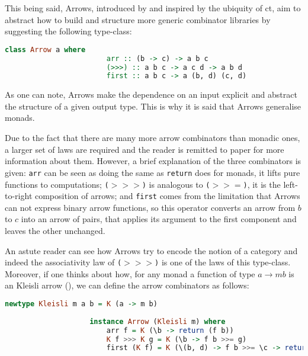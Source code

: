 \documentclass[
  oneside,
  11pt, a4paper,
  footinclude=true,
  headinclude=true,
  cleardoublepage=empty
]{scrbook}
\theoremstyle{definition}
\theoremstyle{definition}
\begin{document}
    	        This being said, Arrows, introduced by \cite{Hughes:2000:GMA:347238.347246} and inspired by the ubiquity of \gls{ct}, aim to abstract how to build and structure more generic combinator libraries by suggesting the following type-class:
    	        
                \begin{lstlisting}[mathescape, language=Haskell, caption={Arrow type-class},captionpos=b]
                    class Arrow a where
                        arr :: (b -> c) -> a b c
                        (>>>) :: a b c -> a c d -> a b d
                        first :: a b c -> a (b, d) (c, d)
    	        \end{lstlisting}{}
    	       
    	       As one can note, Arrows make the dependence on an input explicit and abstract the structure of a given output type. This is why it is said that Arrows generalise monads.
    	       
    	       Due to the fact that there are many more arrow combinators than monadic ones, a larger set of laws are required and the reader is remitted to \cite{Hughes:2000:GMA:347238.347246} paper for more information about them. However, a brief explanation of the three combinators is given: \texttt{arr} can be seen as doing the same as \texttt{return} does for monads, it lifts pure functions to computations; \texttt{($>>>$)} is analogous to \texttt{($>>=$)}, it is the left-to-right composition of arrows; and \texttt{first} comes from the limitation that Arrows can not express binary arrow functions, so this operator converts an arrow from $b$ to $c$ into an arrow of pairs, that applies its argument to the first component and leaves the other unchanged.
    	       
    	       An astute reader can see how Arrows try to encode the notion of a category and indeed the associativity law of \texttt{($>>>$)} is one of the laws of this type-class. Moreover, if one thinks about how, for any monad a function of type $a \rightarrow m b$ is an Kleisli arrow (\cite{Awodey:2010:CT:2060081}), we can define the arrow combinators as follows:
    	        
                \begin{lstlisting}[mathescape, language=Haskell, caption={Arrow Kleisli type-class instance},captionpos=b]
                    newtype Kleisli m a b = K (a -> m b)
                
                    instance Arrow (Kleisli m) where
                        arr f = K (\b -> return (f b))
                        K f >>> K g = K (\b -> f b >>= g)
                        first (K f) = K (\(b, d) -> f b >>= \c -> return (c, d))
                \end{lstlisting}{}
                
\end{document}
